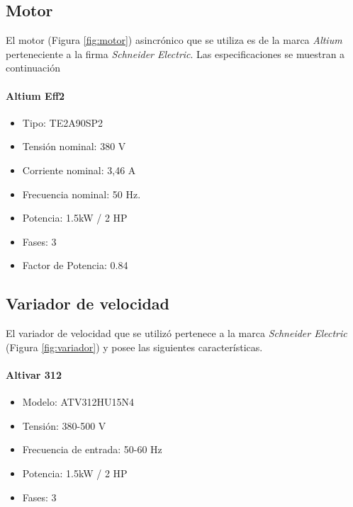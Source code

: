 \subsection{Motor}


El motor (Figura \ref{fig:motor}) asincrónico que se utiliza es de la marca \textit{Altium} perteneciente a la firma \textit{Schneider Electric}. Las especificaciones se muestran a continuación \\
\paragraph*{Altium Eff2}

\begin{minipage}[t]{.5\textwidth}
	\begin{itemize}
		\item Tipo: TE2A90SP2
		\item Tensión nominal: 380 V
		\item Corriente nominal: 3,46 A
		\item Frecuencia nominal:  50 Hz.
		\item Potencia: 1.5kW / 2 HP
		\item Fases: 3
		\item Factor de Potencia: 0.84
	\end{itemize}
\end{minipage}
\begin{minipage}[t]{.5\textwidth}
	\centering{}
	\label{fig:motor}

\end{minipage}

\subsection{Variador de velocidad}



El variador de velocidad que se utilizó pertenece a la marca \textit{Schneider Electric} (Figura \ref{fig:variador}) y posee las siguientes características.
\paragraph*{Altivar 312}
\begin{minipage}[t]{.5\textwidth}
	\begin{itemize}
		\item 	Modelo: ATV312HU15N4
		\item   Tensión: 380-500 V
		\item 	Frecuencia de entrada: 50-60 Hz
		\item 	Potencia: 1.5kW / 2 HP
		\item 	Fases: 3
	\end{itemize}
\end{minipage}
\begin{minipage}[t]{.5\textwidth}
	\centering{}
	\label{fig:variador}
\end{minipage}


